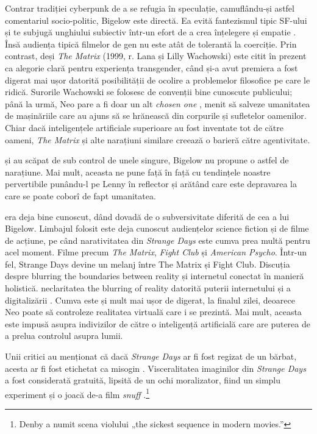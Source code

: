 \documentclass[12pt]{article}
\begin{document}
Contrar \dedouble tradiției\sqtworight\: cyberpunk de a se refugia în speculație, camuflându-și astfel comentariul socio-politic, Bigelow este directă. Ea evită fantezismul tipic SF-ului și te subjugă unghiului subiectiv într-un efort de a crea înțelegere și empatie \cite{Ebert1995a}. Însă audiența tipică filmelor de gen nu este atât de tolerantă la coerciție. Prin contrast, deși \textit{The Matrix} (1999, r. Lana și Lilly Wachowski) este citit în prezent ca alegorie clară pentru experiența transgender, când și-a avut premiera a fost digerat mai ușor datorită posibilității de ocolire a problemelor filosofice pe care le ridică. Surorile Wachowski se folosesc de convenții bine cunoscute publicului; până la urmă, Neo pare a fi doar un alt \textit{chosen one} \cite{}, menit să salveze umanitatea de mașinăriile care au ajuns să se hrănească din corpurile și sufletelor oamenilor. Chiar dacă inteligențele artificiale superioare au fost inventate tot de către oameni, \textit{The Matrix} și alte narațiuni similare creează o barieră către agentivitate. 

 și au scăpat de sub control de unele singure,  Bigelow nu propune o astfel de narațiune. Mai mult, aceasta ne pune față în față cu tendințele noastre pervertibile punându-l pe Lenny în reflector și arătând care este depravarea la care se poate coborî de fapt umanitatea.

era deja bine cunoscut, dând dovadă de o subversivitate diferită de cea a lui Bigelow. Limbajul folosit este deja cunoscut audiențelor science fiction și de filme de acțiune, pe când narativitatea din \textit{Strange Days} este cumva prea multă pentru acel moment. Filme precum \textit{The Matrix}, \textit{Fight Club} și \textit{American Psycho}. Într-un fel, Strange Days devine un melanj între The Matrix și Fight Club. Discuția despre blurring the boundaries between reality și internetul conectat în manieră holistică. neclaritatea the blurring of reality datorită puterii internetului și a digitalizării \cite{El-MahmoudMatrix2022}. Cumva este și mult mai ușor de digerat, la finalul zilei, deoarece Neo poate să controleze realitatea virtuală care i se prezintă. Mai mult, aceasta este impusă asupra indivizilor de către o inteligență artificială care are puterea de a prelua controlul asupra lumii.\par 

Unii critici au menționat că dacă \textit{Strange Days} ar fi fost regizat de un bărbat, acesta ar fi fost etichetat ca misogin \cite{MirasolBigelowUncanny2010}. Visceralitatea imaginilor din \textit{Strange Days} a fost considerată gratuită, lipsită de un ochi moralizator, fiind un simplu experiment și o joacă de-a film \textit{snuff} \cite{Guthmann1995a, DenbyPeopleStrange1995}.\footnote{Denby a numit scena violului „the sickest sequence in modern movies.”}\par
\end{document}
